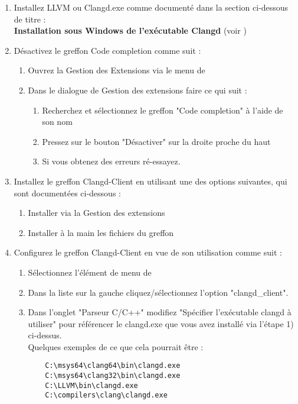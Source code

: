 \begin{enumerate}[noitemsep]
\item Installez LLVM ou Clangd.exe comme documenté dans la section ci-dessous de titre : \\
          \textbf{Installation sous Windows de l'exécutable Clangd} (voir )

\item Désactivez le greffon Code completion comme suit :
    \begin{enumerate}[noitemsep]
    \item Ouvrez la Gestion des Extensions via le menu de \codeblocks \newline
    \item Dans le dialogue de Gestion des extensions faire ce qui suit :
        \begin{enumerate}[noitemsep]
        \item Recherchez et sélectionnez le greffon "Code completion" à l'aide de son nom 
        \item Pressez sur le bouton "Désactiver" sur la droite proche du haut
        \item Si vous obtenez des erreurs ré-essayez.
        \end{enumerate}
    \end{enumerate}
	   
\item Installez le greffon Clangd-Client en utilisant une des options suivantes, qui sont documentées ci-dessous :
    \begin{enumerate}[noitemsep]
    \item Installer via la Gestion des extensions
    \item Installer à la main les fichiers du greffon
    \end{enumerate}
	
\item Configurez le greffon Clangd-Client en vue de son utilisation comme suit :
    \begin{enumerate}[noitemsep]
    \item Sélectionnez l'élément de menu de \codeblocks {}
    \item Dans la liste sur la gauche cliquez/sélectionnez l'option "clangd\_client".
    \item Dans l'onglet "Parseur C/C++" modifiez "Spécifier l'exécutable clangd à utiliser" pour référencer le clangd.exe que vous avez installé via l'étape 1) ci-dessus. \\ 
     Quelques exemples de ce que cela pourrait être :
    \begin{verbatim}
    C:\msys64\clang64\bin\clangd.exe
    C:\msys64\clang32\bin\clangd.exe
    C:\LLVM\bin\clangd.exe
    C:\compilers\clang\clangd.exe
    \end{verbatim}
    \end{enumerate}
\end{enumerate}

